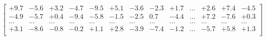 \documentclass[preview]{standalone}
\begin{document}
\begin{align*}
\begin{bmatrix}+9.7 & -5.6 & +3.2 & -4.7 & -9.5 & +5.1 & -3.6 & -2.3 & +1.7 & \dots & +2.6 & +7.4 & -4.5 \\-4.9 & -5.7 & +0.4 & -9.4 & -5.8 & -1.5 & -2.5 & 0.7 & -4.4 & \dots & +7.2 & -7.6 & +0.3 \\\dots & \dots & \dots & \dots & \dots & \dots & \dots & \dots & \dots & \dots & \dots & \dots & \dots \\+3.1 & -8.6 & -0.8 & -0.2 & +1.1 & +2.8 & -3.9 & -7.4 & -1.2 & \dots & -5.7 & +5.8 & +1.3 \\\end{bmatrix}
\end{align*}
\end{document}
